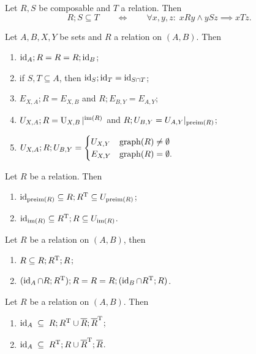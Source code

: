 \begin{lemma} \label{universalQuantificationForCompositionSuperset}
Let $R,S$ be composable and $T$ a relation. Then
\[ R;S \subseteq T \qquad\iff\qquad \forall x,y,z:\; xRy \land ySz \implies xTz. \]
\end{lemma}

\begin{lemma} \label{compositionCanonicalRelations}
Let $A,B,X, Y$ be sets and $R$ a relation on $(A, B)$. Then
\begin{enumerate}
\item $\operatorname{id}_A;R = R = R;\operatorname{id}_B$;
\item if $S,T\subseteq A$, then $\operatorname{id}_{S};\operatorname{id}_{T} = \operatorname{id}_{S\cap T}$;
\item $E_{X,A};R = E_{X,B}$ and $R; E_{B,Y} = E_{A,Y}$;
\item $U_{X,A};R = \operatorname{U}_{X,B}|^{\operatorname{im}(R)}$ and $R; U_{B,Y} = U_{A, Y}|_{\operatorname{preim}(R)}$;
\item $U_{X,A};R;U_{B,Y} = \begin{cases}
U_{X,Y} & \operatorname{graph}(R) \neq \emptyset \\
E_{X,Y} & \operatorname{graph}(R) = \emptyset.
\end{cases}$
\end{enumerate}
\end{lemma}

\begin{lemma} \label{kernelInclusions}
Let $R$ be a relation. Then
\begin{enumerate}
\item $\operatorname{id}_{\operatorname{preim}(R)} \subseteq R;R^{\mathrm{T}} \subseteq U_{\operatorname{preim}(R)}$;
\item $\operatorname{id}_{\operatorname{im}(R)} \subseteq R^{\mathrm{T}};R \subseteq U_{\operatorname{im}(R)}$.
\end{enumerate}
\end{lemma}
\begin{corollary}
Let $R$ be a relation on $(A,B)$, then
\begin{enumerate}
\item $R \subseteq R;R^{\mathrm{T}};R$;
\item $(\operatorname{id}_A \cap R;R^{\mathrm{T}});R = R = R;(\operatorname{id}_{B}\cap R^{\mathrm{T}};R)$.
\end{enumerate}
\end{corollary}
\begin{corollary}
Let $R$ be a relation on $(A,B)$. Then
\begin{enumerate}
\item $\operatorname{id}_A \;\subseteq\; R;R^{\mathrm{T}} \cup \overline{R};\overline{R}^{\mathrm{T}}$;
\item $\operatorname{id}_A \;\subseteq\; R^{\mathrm{T}};R \cup \overline{R}^{\mathrm{T}};\overline{R}$.
\end{enumerate}
\end{corollary}

